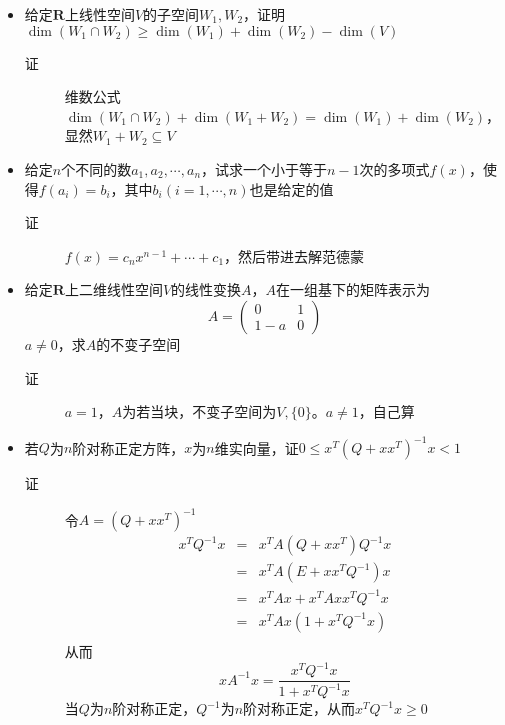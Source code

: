 \begin{itemize}
\item 给定$\mathbf{R}$上线性空间$V$的子空间$W_1,W_2$，证明$\dim(W_1\cap W_2)\geq\dim(W_1)+\dim(W_2)-\dim(V)$
\begin{description}
\item[证] 维数公式$\dim(W_1\cap W_2)+\dim(W_1+ W_2) = \dim(W_1)+\dim(W_2)$，显然$W_1+ W_2\subseteq V$
\end{description}

\item 给定$n$个不同的数$a_1,a_2,\cdots,a_n$，试求一个小于等于$n-1$次的多项式$f(x)$，使得$f(a_i)=b_i$，其中$b_i(i=1,\cdots,n)$也是给定的值
\begin{description}
\item[证] $f(x)=c_nx^{n-1}+\cdots+c_1$，然后带进去解范德蒙
\end{description}

\item 给定$\mathbf{R}$上二维线性空间$V$的线性变换$A$，$A$在一组基下的矩阵表示为
\[
A=\left(
\begin{array}{cc}
0 & 1 \\
1-a & 0
\end{array}
\right)
\]
$a\neq 0$，求$A$的不变子空间
\begin{description}
\item[证] $a=1$，$A$为若当块，不变子空间为$V,\{0\}$。$a\neq 1$，自己算
\end{description}

\item 若$Q$为$n$阶对称正定方阵，$x$为$n$维实向量，证$0\leq x^T(Q+xx^T)^{-1}x<1$
\begin{description}
\item[证] 令$A=(Q+xx^T)^{-1}$
\begin{eqnarray*}
x^TQ^{-1}x&=&x^TA(Q+xx^T)Q^{-1}x\\
&=& x^TA(E+xx^TQ^{-1})x\\
&=& x^TAx+x^TAxx^TQ^{-1}x\\
&=& x^TAx(1+x^TQ^{-1}x)\\
\end{eqnarray*}
从而
\[
xA^{-1}x=\frac{x^TQ^{-1}x}{1+x^TQ^{-1}x}
\]
当$Q$为$n$阶对称正定，$Q^{-1}$为$n$阶对称正定，从而$x^TQ^{-1}x\geq 0$
\end{description}






















\end{itemize}